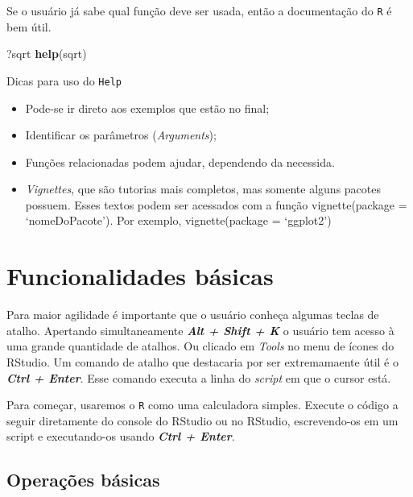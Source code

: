 \documentclass[
]{book}
\newenvironment{Shaded}{\begin{snugshade}}{\end{snugshade}}
\newcommand{\KeywordTok}[1]{\textcolor[rgb]{0.13,0.29,0.53}{\textbf{#1}}}
\newcommand{\NormalTok}[1]{#1}
\providecommand{\tightlist}{%
  \setlength{\itemsep}{0pt}\setlength{\parskip}{0pt}}
\theoremstyle{definition}
\theoremstyle{definition}
\theoremstyle{definition}
\theoremstyle{remark}
\begin{document}
Se o usuário já sabe qual função deve ser usada, então a documentação do \texttt{R} é bem útil.

\begin{Shaded}
\begin{Highlighting}[]
\NormalTok{?sqrt}
\KeywordTok{help}\NormalTok{(sqrt)}
\end{Highlighting}
\end{Shaded}

Dicas para uso do \texttt{Help}

\begin{itemize}
\tightlist
\item
  Pode-se ir direto aos exemplos que estão no final;
\item
  Identificar os parâmetros (\emph{Arguments});
\item
  Funções relacionadas podem ajudar, dependendo da necessida.
\item
  \emph{Vignettes}, que são tutorias mais completos, mas somente alguns pacotes possuem. Esses textos podem ser acessados com a função vignette(package = `nomeDoPacote'). Por exemplo, vignette(package = `ggplot2')
\end{itemize}

\hypertarget{funcionalidades-buxe1sicas}{%
\section{Funcionalidades básicas}\label{funcionalidades-buxe1sicas}}

Para maior agilidade é importante que o usuário conheça algumas teclas de atalho. Apertando simultaneamente \textbf{\emph{Alt + Shift + K}} o usuário tem acesso à uma grande quantidade de atalhos. Ou clicado em \emph{Tools} no menu de ícones do RStudio.
Um comando de atalho que destacaria por ser extremamaente útil é o \textbf{\emph{Ctrl + Enter}}. Esse comando executa a linha do \emph{script} em que o cursor está.

Para começar, usaremos o \texttt{R} como uma calculadora simples. Execute o código a seguir diretamente do console do RStudio ou no RStudio, escrevendo-os em um script e executando-os usando \textbf{\emph{Ctrl + Enter}}.

\hypertarget{operauxe7uxf5es-buxe1sicas}{%
\subsection{Operações básicas}\label{operauxe7uxf5es-buxe1sicas}}
\end{document}
